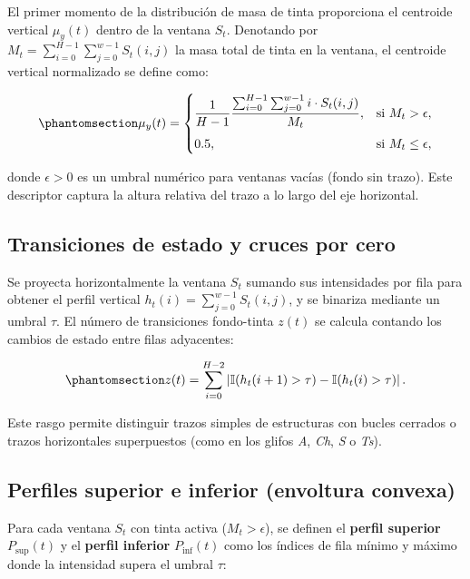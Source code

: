 \documentclass[
  spanish,
  us-letterpaper,
]{scrreprt}
\theoremstyle{definition}
\theoremstyle{remark}
\begin{document}
El primer momento de la distribución de masa de tinta proporciona el
centroide vertical \(\mu_y(t)\) dentro de la ventana \(S_t\). Denotando
por \(M_t = \sum_{i=0}^{H-1} \sum_{j=0}^{w-1} S_t(i,j)\) la masa total
de tinta en la ventana, el centroide vertical normalizado se define
como:

\begin{equation}\phantomsection\label{eq-centroide-vertical}{
\mu_y(t) =
\begin{cases}
\dfrac{1}{H - 1} \dfrac{\sum_{i=0}^{H-1} \sum_{j=0}^{w-1} i \cdot S_t(i,j)}{M_t}, & \text{si } M_t > \epsilon, \\[10pt]
0.5, & \text{si } M_t \le \epsilon,
\end{cases}
}\end{equation}

donde \(\epsilon > 0\) es un umbral numérico para ventanas vacías (fondo
sin trazo). Este descriptor captura la altura relativa del trazo a lo
largo del eje horizontal.

\subsection{Transiciones de estado y cruces por
cero}\label{transiciones-de-estado-y-cruces-por-cero}

Se proyecta horizontalmente la ventana \(S_t\) sumando sus intensidades
por fila para obtener el perfil vertical
\(h_t(i) = \sum_{j=0}^{w-1} S_t(i,j)\), y se binariza mediante un umbral
\(\tau\). El número de transiciones fondo-tinta \(z(t)\) se calcula
contando los cambios de estado entre filas adyacentes:

\begin{equation}\phantomsection\label{eq-transiciones-tinta}{
z(t) = \sum_{i=0}^{H-2} \left| \mathbb{I}(h_t(i+1) > \tau) - \mathbb{I}(h_t(i) > \tau) \right|.
}\end{equation}

Este rasgo permite distinguir trazos simples de estructuras con bucles
cerrados o trazos horizontales superpuestos (como en los glifos
\emph{A}, \emph{Ch}, \emph{S} o \emph{Ts}).

\subsection{Perfiles superior e inferior (envoltura
convexa)}\label{perfiles-superior-e-inferior-envoltura-convexa}

Para cada ventana \(S_t\) con tinta activa (\(M_t > \epsilon\)), se
definen el \textbf{perfil superior} \(P_{\text{sup}}(t)\) y el
\textbf{perfil inferior} \(P_{\text{inf}}(t)\) como los índices de fila
mínimo y máximo donde la intensidad supera el umbral \(\tau\):
\end{document}
